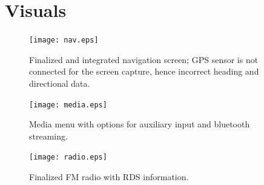 \documentclass[onecolumn, draftclsnofoot, 10pt, compsoc]{IEEEtran}
\begin{document}
\section{Visuals}
\begin{figure}[h]
\texttt{[image: nav.eps]}
\centering
\caption{Finalized and integrated navigation screen; GPS sensor is not connected for the screen capture, hence incorrect heading and directional data.}
\end{figure}

\begin{figure}[h]
\texttt{[image: media.eps]}
\centering
\caption{Media menu with options for auxiliary input and bluetooth streaming.}
\end{figure}

\begin{figure}[h]
\texttt{[image: radio.eps]}
\centering
\caption{Finalized FM radio with RDS information.}
\end{figure}
\end{document}
